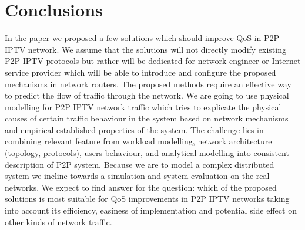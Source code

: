 \documentclass[10pt, conference, compsocconf]{IEEEtran}
\begin{document}
\section{Conclusions}
In the paper we proposed a few solutions which should improve QoS in P2P IPTV network. We assume that the solutions will not directly modify existing P2P IPTV protocols but rather will be dedicated for network engineer or Internet service provider which will be able to introduce and configure the proposed mechanisms in network routers. The proposed methods require an effective way to predict the flow of traffic through the network. We are going to use physical modelling for P2P IPTV network traffic which tries to explicate the physical causes of certain traffic behaviour in the system based on network mechanisms and empirical established properties of the system. The challenge lies in combining relevant feature from workload modelling, network architecture (topology, protocols), users behaviour, and analytical modelling into consistent description of P2P system. Because we are to model a complex distributed system we incline towards a simulation and system evaluation on the real networks. We expect to find answer for the question: which of the proposed solutions is most suitable for QoS improvements in P2P IPTV networks taking into account its efficiency, easiness of implementation and potential side effect on other kinds of network traffic.  




\end{document}
